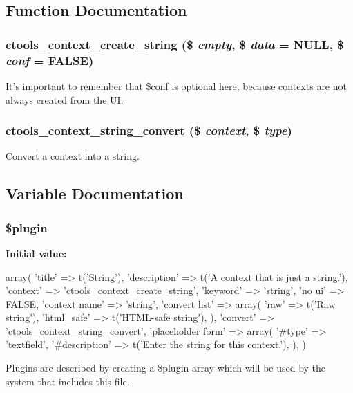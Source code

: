 \subsection{Function Documentation}
\hypertarget{contexts_2string_8inc_ab651d513ca31a0ca745a12a096fa5db3}{
\subsubsection[{ctools\_\-context\_\-create\_\-string}]{\setlength{\rightskip}{0pt plus 5cm}ctools\_\-context\_\-create\_\-string (\$ {\em empty}, \/  \$ {\em data} = {\ttfamily NULL}, \/  \$ {\em conf} = {\ttfamily FALSE})}}
\label{contexts_2string_8inc_ab651d513ca31a0ca745a12a096fa5db3}
It's important to remember that \$conf is optional here, because contexts are not always created from the UI. \hypertarget{contexts_2string_8inc_a075694e2e95ab80f542b8e119617c8de}{
\subsubsection[{ctools\_\-context\_\-string\_\-convert}]{\setlength{\rightskip}{0pt plus 5cm}ctools\_\-context\_\-string\_\-convert (\$ {\em context}, \/  \$ {\em type})}}
\label{contexts_2string_8inc_a075694e2e95ab80f542b8e119617c8de}
Convert a context into a string. 

\subsection{Variable Documentation}
\hypertarget{contexts_2string_8inc_ada8a7130088351710bb02ed622d6bf65}{
\subsubsection[{\$plugin}]{\setlength{\rightskip}{0pt plus 5cm}\$plugin}}
\label{contexts_2string_8inc_ada8a7130088351710bb02ed622d6bf65}
{\bfseries Initial value:}
\begin{DoxyCode}
 array(
  'title' => t('String'),
  'description' => t('A context that is just a string.'),
  'context' => 'ctools_context_create_string',
  'keyword' => 'string',
  'no ui' => FALSE,
  'context name' => 'string',
  'convert list' => array(
    'raw' => t('Raw string'),
    'html_safe' => t('HTML-safe string'),
  ),
  'convert' => 'ctools_context_string_convert',
  'placeholder form' => array(
    '#type' => 'textfield',
    '#description' => t('Enter the string for this context.'),
  ),
)
\end{DoxyCode}
Plugins are described by creating a \$plugin array which will be used by the system that includes this file. 